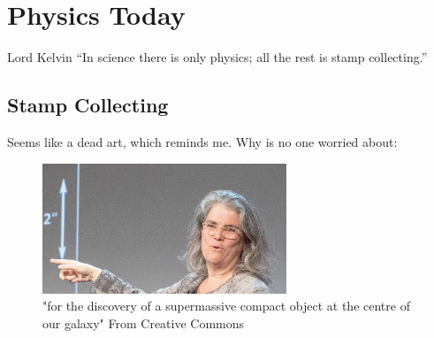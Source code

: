 \documentclass[../rzero]{subfiles}
\begin{document}
\chapter{Physics Today}\label{physicsTodayChapter}

\begin{chapquote}{Lord Kelvin}
``In science there is only physics; all the rest is stamp collecting.''
\end{chapquote}





\section{Stamp Collecting}
Seems like a dead art, which reminds me. Why is no one worried about:
\begin{figure}
\includegraphics[width=0.65\textwidth]{chapters/images/andrea-ghez.jpg}
\caption{"for the discovery of a supermassive compact object at the centre of our galaxy"   From\cite{borderlinerebelEnglishAndreaGhez2019} Creative Commons}
\label{andrea-ghez}
\end{figure}
\end{document}
